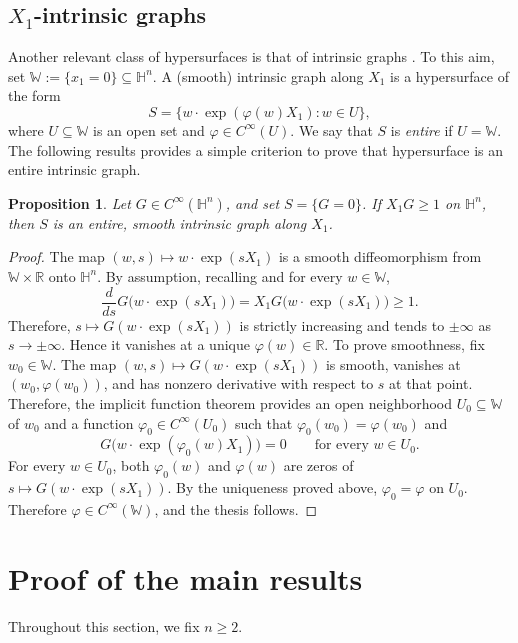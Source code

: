 \documentclass[11pt]{amsart}
\renewcommand{\geq}{\geqslant}
\newcommand{\hh}{{\mathbb{H}}}
\newtheorem{proposition}[theorem]{Proposition}
\theoremstyle{definition}
\theoremstyle{remark}
\numberwithin{equation}{section}
\begin{document}
\subsection{$X_1$-intrinsic graphs}
Another relevant class of hypersurfaces is that of intrinsic graphs \cite{MR1871966}. To this aim, set $\mathbb{W}:=\{x_1=0\}\subseteq\hh^n$. A (smooth) intrinsic
graph along $X_1$ is a hypersurface of the form
\[
    S=\{w\cdot\exp(\varphi(w)X_1):w\in U\},
\]
where $U\subseteq\mathbb{W}$ is an open set and
$\varphi\in C^\infty(U)$. We say that $S$ is \emph{entire} if
$U=\mathbb{W}$.
The following results provides a simple criterion to prove that hypersurface is an entire intrinsic graph.
\begin{proposition}\label{propcriteriointrinsic}
Let $G\in C^\infty(\hh^n)$, and set 
$S=\{G=0\}$. If $X_1G\geqslant 1$ on $\hh^n$, then $S$ is an entire, smooth intrinsic graph along $X_1$.
\end{proposition}
\begin{proof}
The map $(w,s)\mapsto w\cdot\exp(sX_1)$ is a smooth diffeomorphism
from $\mathbb{W}\times\mathbb{R}$ onto $\hh^n$. By assumption, recalling \cite[Lemma 2.12.1]{MR746308} and for every
$w\in\mathbb{W}$,
\[
    \frac{d}{ds}G\bigl(w\cdot\exp(sX_1)\bigr)
    =X_1G\bigl(w\cdot\exp(sX_1)\bigr)\geqslant 1.
\]
Therefore, $s\mapsto G(w\cdot\exp(sX_1))$ is strictly increasing
and tends to $\pm\infty$ as $s\to\pm\infty$. Hence it vanishes at
a unique $\varphi(w)\in\mathbb{R}$. To prove smoothness, fix $w_0\in\mathbb{W}$. The map
$(w,s)\mapsto G(w\cdot\exp(sX_1))$ is smooth, vanishes at
$(w_0,\varphi(w_0))$, and has nonzero derivative with respect to
$s$ at that point. Therefore, the implicit function theorem
provides an open neighborhood $U_0\subseteq\mathbb{W}$ of $w_0$
and a function $\varphi_0\in C^\infty(U_0)$ such that
$\varphi_0(w_0)=\varphi(w_0)$ and
\[
    G\bigl(w\cdot\exp(\varphi_0(w)X_1)\bigr)=0
    \qquad\text{for every }w\in U_0.
\]
For every $w\in U_0$, both $\varphi_0(w)$ and $\varphi(w)$
are zeros of $s\mapsto G(w\cdot\exp(sX_1))$. By the uniqueness
proved above, $\varphi_0=\varphi$ on $U_0$. Therefore
$\varphi\in C^\infty(\mathbb{W})$, and the thesis follows.
\end{proof}
\section{Proof of the main results}
Throughout this section, we fix $n\geq 2$.
\end{document}
